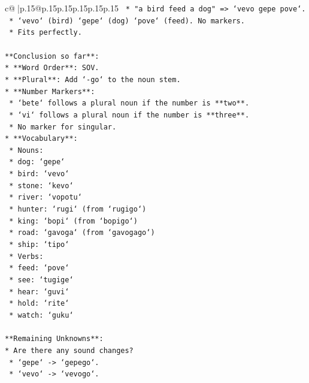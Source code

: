 \documentclass{article}
\begin{document}
{\begin{supertabular}{c@{$\;$}|p{.15\linewidth}@{}p{.15\linewidth}p{.15\linewidth}p{.15\linewidth}p{.15\linewidth}p{.15\linewidth}}
{{{\texttt{    *   "a bird feed a dog" => `vevo gepe pove`.} \\
\texttt{        *   `vevo` (bird) `gepe` (dog) `pove` (feed). No markers.} \\
\texttt{        *   Fits perfectly.} \\
\\ 
\texttt{**Conclusion so far**:} \\
\texttt{*   **Word Order**: SOV.} \\
\texttt{*   **Plural**: Add `{-}go` to the noun stem.} \\
\texttt{*   **Number Markers**:} \\
\texttt{    *   `bete` follows a plural noun if the number is **two**.} \\
\texttt{    *   `vi` follows a plural noun if the number is **three**.} \\
\texttt{    *   No marker for singular.} \\
\texttt{*   **Vocabulary**:} \\
\texttt{    *   Nouns:} \\
\texttt{        *   dog: `gepe`} \\
\texttt{        *   bird: `vevo`} \\
\texttt{        *   stone: `kevo`} \\
\texttt{        *   river: `vopotu`} \\
\texttt{        *   hunter: `rugi` (from `rugigo`)} \\
\texttt{        *   king: `bopi` (from `bopigo`)} \\
\texttt{        *   road: `gavoga` (from `gavogago`)} \\
\texttt{        *   ship: `tipo`} \\
\texttt{    *   Verbs:} \\
\texttt{        *   feed: `pove`} \\
\texttt{        *   see: `tugige`} \\
\texttt{        *   hear: `guvi`} \\
\texttt{        *   hold: `rite`} \\
\texttt{        *   watch: `guku`} \\
\\ 
\texttt{**Remaining Unknowns**:} \\
\texttt{*   Are there any sound changes?} \\
\texttt{    *   `gepe` {-}> `gepego`.} \\
\texttt{    *   `vevo` {-}> `vevogo`.} \\
}}}
\end{supertabular}}
\end{document}
